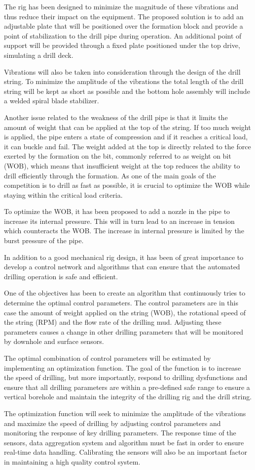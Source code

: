 The rig has been designed to minimize the magnitude of these vibrations and thus reduce their impact on the equipment. The proposed solution is to add an adjustable plate that will be positioned over the formation block and provide a point of stabilization to the drill pipe during operation. An additional point of support will be provided through a fixed plate positioned under the top drive, simulating a drill deck.

Vibrations will also be taken into consideration through the design of the drill string. To minimize the amplitude of the vibrations the total length of the drill string will be kept as short as possible and the bottom hole assembly will include a welded spiral blade stabilizer.
 
Another issue related to the weakness of the drill pipe is that it limits the amount of weight that can be applied at the top of the string. If too much weight is applied, the pipe enters a state of compression and if it reaches a critical load, it can buckle and fail. The weight added at the top is directly related to the force exerted by the formation on the bit, commonly referred to as weight on bit (WOB), which means that insufficient weight at the top reduces the ability to drill efficiently through the formation. As one of the main goals of the competition is to drill as fast as possible, it is crucial to optimize the WOB while staying within the critical load criteria.

To optimize the WOB, it has been proposed to add a nozzle in the pipe to increase its internal pressure. This will in turn lead to an increase in tension which counteracts the WOB. The increase in internal pressure is limited by the burst pressure of the pipe.

In addition to a good mechanical rig design, it has been of great importance to develop a control network and algorithms that can ensure that the automated drilling operation is safe and efficient.

One of the objectives has been to create an algorithm that continuously tries to determine the optimal control parameters. The control parameters are in this case the amount of weight applied on the string (WOB), the rotational speed of the string (RPM) and the flow rate of the drilling mud. Adjusting these parameters causes a change in other drilling parameters that will be monitored by downhole and surface sensors.

The optimal combination of control parameters will be estimated by implementing an optimization function. The goal of the function is to increase the speed of drilling, but more importantly, respond to drilling dysfunctions and ensure that all drilling parameters are within a pre-defined safe range to ensure a vertical borehole and maintain the integrity of the drilling rig and the drill string. 

The optimization function will seek to minimize the amplitude of the vibrations and maximize the speed of drilling by adjusting control parameters and monitoring the response of key drilling parameters. The response time of the sensors, data aggregation system and algorithm must be fast in order to ensure real-time data handling. Calibrating the sensors will also be an important factor in maintaining a high quality control system. 